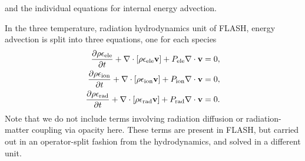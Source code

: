 \documentclass[preprint,11pt]{aastex}
\newcommand{\bea}{\begin{eqnarray}}
\newcommand{\eea}{\end{eqnarray}}
\begin{document}
and the individual equations for internal energy advection.  {\color{red}In the three temperature, radiation hydrodynamics unit of FLASH, energy advection is split into three equations, one for each species
\bea 
\frac{\partial \rho \epsilon_{\rm ele}}{\partial t} + \nabla \cdot [\rho \epsilon_{\rm ele} \mathbf{v}] + P_{\rm ele} \nabla \cdot \mathbf{v} = 0, \\
\frac{\partial \rho \epsilon_{\rm ion}}{\partial t} + \nabla \cdot [\rho \epsilon_{\rm ion} \mathbf{v}] + P_{\rm ion} \nabla \cdot \mathbf{v} = 0, \\
\frac{\partial \rho \epsilon_{\rm rad}}{\partial t} + \nabla \cdot [\rho \epsilon_{\rm rad} \mathbf{v}] + P_{\rm rad} \nabla \cdot \mathbf{v} = 0.
\eea
Note that we do not include terms involving radiation diffusion or radiation-matter coupling via opacity here.  These terms are present in FLASH, but carried out in an operator-split fashion from the hydrodynamics, and solved in a different unit.

}
\end{document}

